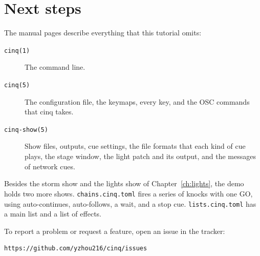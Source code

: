 %

\chapter{Next steps}
\label{ch:next}

The manual pages describe everything that this tutorial omits:

\begin{description}
\item[\texttt{cinq(1)}] The command line.
\item[\texttt{cinq(5)}] The configuration file, the keymaps, every key, and the
  OSC commands that cinq takes.
\item[\texttt{cinq-show(5)}] Show files, outputs, cue settings, the file
  formats that each kind of cue plays, the stage window, the light patch and
  its output, and the messages of network cues.
\end{description}

Besides the storm show and the lights show of Chapter~\ref{ch:lights}, the
demo holds two more shows.  \texttt{chains.cinq.toml} fires a series of
knocks with one GO, using auto-continues, auto-follows, a wait, and a stop
cue.  \texttt{lists.cinq.toml} has a main list and a list of effects.

To report a problem or request a feature, open an issue in the tracker:

\begin{verbatim}
https://github.com/yzhou216/cinq/issues
\end{verbatim}
